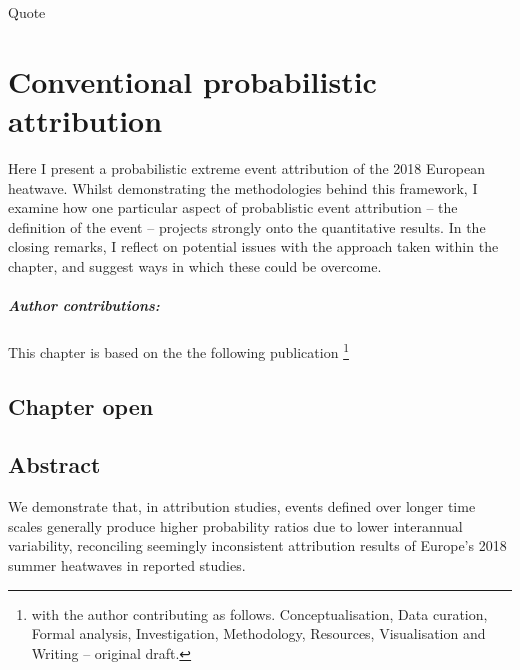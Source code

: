 \begin{savequote}[8cm]
    Quote
\end{savequote}
    
\chapter{\label{ch1}Conventional probabilistic attribution} 

Here I present a probabilistic extreme event attribution of the 2018 European heatwave. Whilst demonstrating the methodologies behind this framework, I examine how one particular aspect of probablistic event attribution -- the definition of the event -- projects strongly onto the quantitative results. In the closing remarks, I reflect on potential issues with the approach taken within the chapter, and suggest ways in which these could be overcome.
\small\paragraph{Author contributions:} This chapter is based on the the following publication \footnote{with the author contributing as follows. Conceptualisation, Data curation, Formal analysis, Investigation, Methodology, Resources, Visualisation and Writing -- original draft.} \par\vspace{1em}


\minitoc

\clearpage

\section{Chapter open}

\section{Abstract}

  We demonstrate that, in attribution studies, events defined over longer time scales generally produce higher probability ratios due to lower interannual variability, reconciling seemingly inconsistent attribution results of Europe's 2018 summer heatwaves in reported studies.

